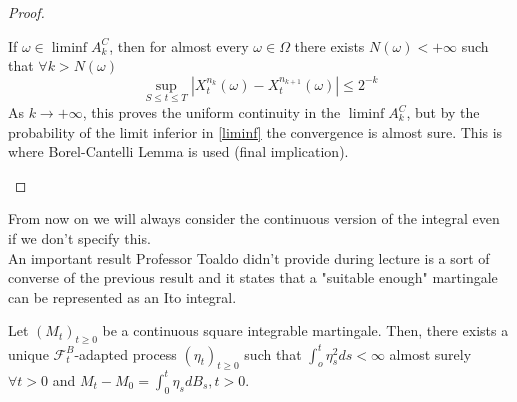 \begin{proof}
\begin{itemize}
\begin{equation}
    \end{equation}
    If $\omega \in \liminf A_k^C$, then for almost every $\omega \in \Omega$ there exists $N(\omega) < +\infty$ such that $ \forall k > N(\omega)$
    \begin{equation*}
        \sup_{S \leq t \leq T} |X_t^{n_k}(\omega) - X_t^{n_{k+1}}(\omega)| \leq 2^{-k}
    \end{equation*}
    As $k \rightarrow +\infty$, this proves the uniform continuity in the $\liminf A^C_k$, but by the probability of the limit inferior in \ref{liminf} the convergence is almost sure. This is where Borel-Cantelli Lemma is used (final implication). 
    \end{itemize}
\end{proof}
From now on we will always consider the continuous version of the integral even if we don't specify this. \\

An important result Professor Toaldo didn't provide during lecture is a sort of converse of the previous result and it states that a "suitable enough" martingale can be represented as an Ito integral. 
\begin{ThBox}
    \begin{Th}
        Let $(M_t)_{t \geq 0}$ be a continuous square integrable martingale. Then, there exists a unique $\mathcal{F}_t^B$-adapted process $(\eta_t)_{t \geq 0}$ such that $\int_o^t \eta_s^2 ds < \infty$ almost surely $\forall t > 0$ and $M_t - M_0 = \int_0^t \eta_s dB_s, t > 0$.
    \end{Th}
\end{ThBox}

